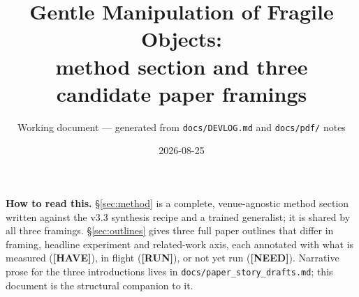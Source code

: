 \documentclass[11pt]{article}
\title{Gentle Manipulation of Fragile Objects:\\
       method section and three candidate paper framings}
\author{Working document --- generated from \texttt{docs/DEVLOG.md} and \texttt{docs/pdf/} notes}
\date{2026-08-25}
\begin{document}
\maketitle

\noindent\textbf{How to read this.} \S\ref{sec:method} is a complete, venue-agnostic method
section written against the v3.3 synthesis recipe and a trained generalist; it is shared by
all three framings. \S\ref{sec:outlines} gives three full paper outlines that differ in
framing, headline experiment and related-work axis, each annotated with what is measured
(\textbf{[HAVE]}), in flight (\textbf{[RUN]}), or not yet run (\textbf{[NEED]}). Narrative
prose for the three introductions lives in \texttt{docs/paper\_story\_drafts.md}; this
document is the structural companion to it.

\tableofcontents







\end{document}
